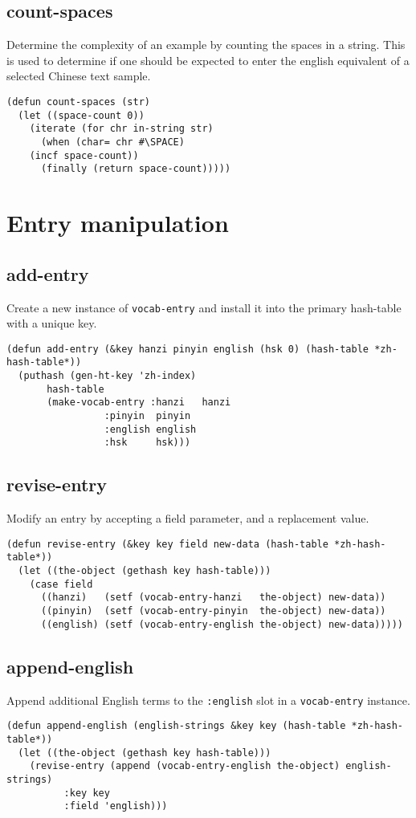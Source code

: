 \documentclass[11pt]{article}
\begin{document}
\subsection{count-spaces}
\label{sec-4-6}
Determine the complexity of an example by counting the spaces in a string. This
is used to determine if one should be expected to enter the english equivalent
of a selected Chinese text sample.
\begin{verbatim}
(defun count-spaces (str)
  (let ((space-count 0))
    (iterate (for chr in-string str)
      (when (char= chr #\SPACE)
	(incf space-count))
      (finally (return space-count)))))
\end{verbatim}
\section{Entry manipulation}
\label{sec-5}
\subsection{add-entry}
\label{sec-5-1}
Create a new instance of \texttt{vocab-entry} and install it into the primary
hash-table with a unique key.
\begin{verbatim}
(defun add-entry (&key hanzi pinyin english (hsk 0) (hash-table *zh-hash-table*))
  (puthash (gen-ht-key 'zh-index)
	   hash-table
	   (make-vocab-entry :hanzi   hanzi
			     :pinyin  pinyin
			     :english english
			     :hsk     hsk)))
\end{verbatim}
\subsection{revise-entry}
\label{sec-5-2}
Modify an entry by accepting a field parameter, and a replacement value.
\begin{verbatim}
(defun revise-entry (&key key field new-data (hash-table *zh-hash-table*))
  (let ((the-object (gethash key hash-table)))
    (case field
      ((hanzi)   (setf (vocab-entry-hanzi   the-object) new-data))
      ((pinyin)  (setf (vocab-entry-pinyin  the-object) new-data))
      ((english) (setf (vocab-entry-english the-object) new-data)))))
\end{verbatim}
\subsection{append-english}
\label{sec-5-3}
Append additional English terms to the \texttt{:english} slot in a \texttt{vocab-entry}
instance.
\begin{verbatim}
(defun append-english (english-strings &key key (hash-table *zh-hash-table*))
  (let ((the-object (gethash key hash-table)))
    (revise-entry (append (vocab-entry-english the-object) english-strings)
		  :key key
		  :field 'english)))
\end{verbatim}
\end{document}

